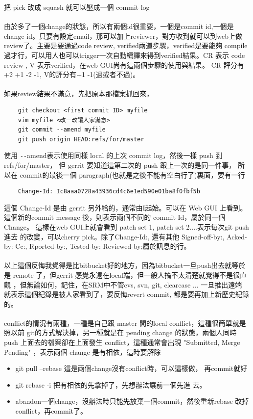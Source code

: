     把 pick 改成 squash 就可以壓成一個 commit log
    \\\\
    由於多了一個change的狀態，所以有兩個id很重要，一個是commit id,一個是
    change id。只要有設定email，那可以加上reviewer，對方收到就可以到web上做
    review了。主要是要通過code review, verified兩道步驟，verified是要能夠
    compile過才行，可以用人也可以trigger一次自動編譯來得到verified結果。CR 表示
    code review , V 表示verified，在web GUI尚有這兩個步驟的使用與結果。
    CR 評分有 +2 +1 -2 -1, V的評分有+1 -1(過或者不過)。
    \\\\
    如果review結果不滿意，先把原本那檔案抓回來，
    \begin{verbatim}
    git checkout <first commit ID> myfile
    vim myfile <改一改讓人家滿意>
    git commit --amend myfile
    git push origin HEAD:refs/for/master
    \end{verbatim}
    使用 \verb=--=amend表示使用同樣 local 的上次 commit log，然後一樣 push 到
    refs/for/master， 但 gerrit 要知道這第二次的 push 跟上一次的是同一件事，
    所以在 commit的最後一個 paragraph(也就是之後不能有空白行了)裏面，要有一行
    \begin{verbatim}
    Change-Id: Ic8aaa0728a43936cd4c6e1ed590e01ba8f0fbf5b
    \end{verbatim}
    這個 Change-Id 是由 gerrit 另外給的，通常由I起始。可以在 Web GUI 上看到。
    這個新的commit message 後，則表示兩個不同的 commit Id，屬於同一個 Change。
    這樣在web GUI上就會看到 patch set 1, patch set 2....表示每次git push進去
    的改變，可以cherry pick。除了Change-Id:, 還有其他 Signed-off-by:, Acked-by:
    Cc:, Rported-by:, Tested-by: Reviewed-by;屬於訊息的行。
    \\\\
    以上這個反悔我覺得是比bitbucket好的地方，因為bitbucket一旦push出去就等於是
    remote 了，但gerrit 感覺永遠在local端，但一般人搞不太清楚就覺得不是很直觀
    ，但無論如何，記住，在SRM中不管cvs, svn, git, clearcase ... 一旦推出遠端
    就表示這個紀錄是被人家看到了，要反悔revert commit, 都是要再加上新歷史紀錄的。
    \\\\
    conflict的情況有兩種，一種是自己跟 master 間的local conflict，這種很簡單就是
    照以前 git的方式解決掉，另一種就是在 pending change 的狀態，兩個人同時push
    上面去的檔案卻在上面發生 conflict，這種通常會出現 "Submitted, Merge Pending"
    ，表示兩個 change 是有相依，這時要解除
    \begin{itemize}
      \item git pull --rebase 這是兩個change沒有conflict時，可以這樣做，
        再commit就好
      \item git rebase -i 把有相依的先拿掉了，先想辦法讓前一個先進
        去。
      \item abandon一個change，沒辦法時只能先放棄一個commit，然後重新rebase
        改掉conflict，再commit了。
    \end{itemize}
